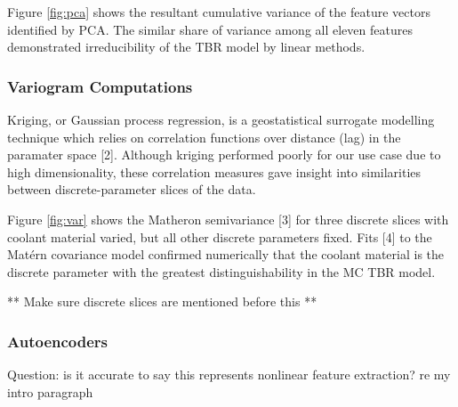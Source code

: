 Figure \ref{fig:pca} shows the resultant cumulative variance of the feature vectors identified by PCA. The similar share of variance among all eleven features demonstrated irreducibility of the TBR model by linear methods.

\subsubsection{Variogram Computations}

Kriging, or Gaussian process regression, is a geostatistical surrogate modelling technique which relies on correlation functions over distance (lag) in the paramater space [2]. Although kriging performed poorly for our use case due to high dimensionality, these correlation measures gave insight into similarities between discrete-parameter slices of the data.

Figure \ref{fig:var} shows the Matheron semivariance [3] for three discrete slices with coolant material varied, but all other discrete parameters fixed. Fits [4] to the Matérn covariance model confirmed numerically that the coolant material is the discrete parameter with the greatest distinguishability in the MC TBR model. 


** Make sure discrete slices are mentioned before this **

\subsubsection{Autoencoders}

Question: is it accurate to say this represents nonlinear feature extraction? re my intro paragraph

\newpage
